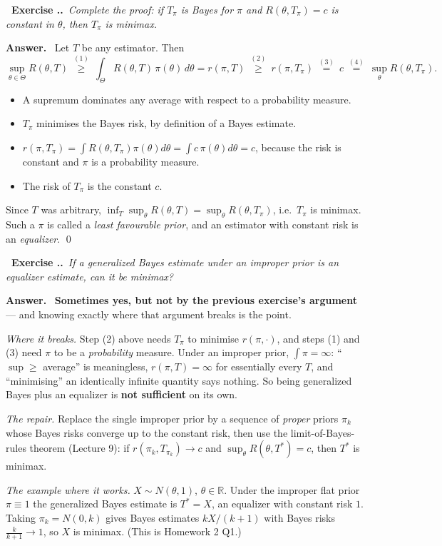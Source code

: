 \documentclass[11pt]{article}
\newcommand{\R}{\mathbb{R}}
\newcounter{exc}[section]
\newenvironment{exc}[1]{\medskip\refstepcounter{exc}%
  \noindent\textbf{\color{ForestGreen}\raisebox{0.5pt}{\scriptsize$\blacksquare$}\ Exercise \thesection.\theexc.}\ \textit{#1}\par\nopagebreak}{\par}
\newcommand{\ans}{\smallskip\noindent\textbf{Answer.}\ }
\begin{document}
\begin{exc}{Complete the proof: if $T_\pi$ is Bayes for $\pi$ and $R(\theta,T_\pi)=c$ is
constant in $\theta$, then $T_\pi$ is minimax.}
\end{exc}
\ans
Let $T$ be any estimator. Then
\[
\sup_{\theta\in\Theta}R(\theta,T)
\ \overset{(1)}{\ge}\ \int_\Theta R(\theta,T)\,\pi(\theta)\,d\theta=r(\pi,T)
\ \overset{(2)}{\ge}\ r(\pi,T_\pi)
\ \overset{(3)}{=}\ c
\ \overset{(4)}{=}\ \sup_{\theta}R(\theta,T_\pi).
\]
\begin{itemize}
\item[(1)] A supremum dominates any average with respect to a probability measure.
\item[(2)] $T_\pi$ minimises the Bayes risk, by definition of a Bayes estimate.
\item[(3)] $r(\pi,T_\pi)=\int R(\theta,T_\pi)\pi(\theta)d\theta=\int c\,\pi(\theta)d\theta=c$,
because the risk is constant and $\pi$ is a probability measure.
\item[(4)] The risk of $T_\pi$ is the constant $c$.
\end{itemize}
Since $T$ was arbitrary, $\inf_T\sup_\theta R(\theta,T)=\sup_\theta R(\theta,T_\pi)$, i.e.\
$T_\pi$ is minimax. Such a $\pi$ is called a \emph{least favourable prior}, and an estimator
with constant risk is an \emph{equalizer}. \qed

\begin{exc}{If a generalized Bayes estimate under an improper prior is an equalizer estimate,
can it be minimax?}
\end{exc}
\ans
\textbf{Sometimes yes, but not by the previous exercise's argument} --- and knowing exactly
where that argument breaks is the point.

\emph{Where it breaks.} Step (2) above needs $T_\pi$ to minimise $r(\pi,\cdot)$, and steps
(1) and (3) need $\pi$ to be a \emph{probability} measure. Under an improper prior,
$\int\pi=\infty$: ``$\sup\ge$ average'' is meaningless, $r(\pi,T)=\infty$ for essentially
every $T$, and ``minimising'' an identically infinite quantity says nothing. So being
generalized Bayes plus an equalizer is \textbf{not sufficient} on its own.

\emph{The repair.} Replace the single improper prior by a sequence of \emph{proper} priors
$\pi_k$ whose Bayes risks converge up to the constant risk, then use the limit-of-Bayes-rules
theorem (Lecture 9): if $r(\pi_k,T_{\pi_k})\to c$ and $\sup_\theta R(\theta,T^*)=c$, then
$T^*$ is minimax.

\emph{The example where it works.} $X\sim N(\theta,1)$, $\theta\in\R$. Under the improper flat
prior $\pi\equiv1$ the generalized Bayes estimate is $T^*=X$, an equalizer with constant risk
$1$. Taking $\pi_k=N(0,k)$ gives Bayes estimates $kX/(k+1)$ with Bayes risks
$\tfrac{k}{k+1}\to1$, so $X$ is minimax. (This is Homework 2 Q1.)
\end{document}
